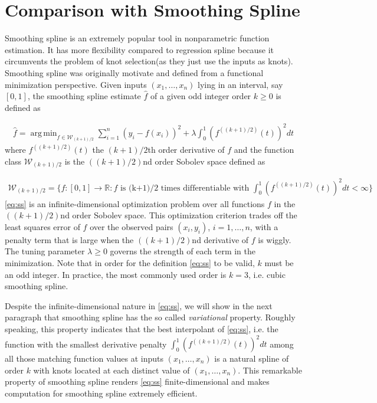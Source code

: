 \documentclass[a4paper]{article}
\DeclareMathOperator*{\argmin}{arg\,min}
\newcommand{\RR}{\mathbb{R}}
\renewcommand{\cal}{\mathcal}
\begin{document}
\section{Comparison with Smoothing Spline}
\label{sec:comp_ss}
Smoothing spline is an extremely popular tool in nonparametric function estimation. It has more flexibility compared to regression spline because it circumvents the problem of knot selection(as they just use the inputs as knots). Smoothing spline was originally motivate and defined from a functional minimization perspective. Given inputs $(x_1,\ldots, x_n)$ lying in an interval, say $[0, 1]$, the smoothing spline estimate $\hat{f}$ of a given odd integer order $k\geq 0$ is defined as

\begin{align}
\hat{f} = \argmin_{f\in\cal{W}_{(k+1)/2}}\sum_{i=1}^n (y_i - f(x_i))^2 + \lambda \int_0^1 (f^{((k+1)/2)}(t))^2dt
\label{eq:ss}
\end{align}
where $f^{((k+1)/2)}(t)$ the $(k+1)/2$th order derivative of $f$ and the function class $\cal{W}_{(k+1)/2}$ is the $((k+1)/2)$nd order Sobolev space defined as

\begin{align*}
\cal{W}_{(k+1)/2} = \big\{f:[0,1]\rightarrow \RR:f\text{ is (k+1)/2 times differentiable with } \int_0^1(f^{((k+1)/2)}(t))^2dt<\infty\big\}
\end{align*}
\eqref{eq:ss} is an infinite-dimensional optimization problem over all functions $f$ in the $((k+1)/2)$nd order Sobolev space. This optimization criterion trades off the least squares error of $f$ over the observed pairs $(x_i, y_i)$, $i=1,\ldots, n$, with a penalty term that is large when the $((k+1)/2)$nd derivative of $f$ is wiggly. The tuning parameter $\lambda \geq 0$ governs the strength of each term in the minimization. Note that in order for the definition \eqref{eq:ss} to be valid, $k$ must be an odd integer. In practice, the most commonly used order is $k = 3$, i.e. cubic smoothing spline. 

Despite the infinite-dimensional nature in \eqref{eq:ss}, we will show in the next paragraph that smoothing spline has the so called \textit{variational} property. Roughly speaking, this property indicates that the best interpolant of \eqref{eq:ss}, i.e. the function with the smallest derivative penalty $\int_0^1(f^{((k+1)/2)}(t))^2dt$ among all those matching function values at inputs $(x_1,\ldots, x_n)$ is a natural spline of order $k$ with knots located at each distinct value of $(x_1,\ldots, x_n)$. This remarkable property of smoothing spline renders \eqref{eq:ss} finite-dimensional and makes computation for smoothing spline extremely efficient.
\end{document}
